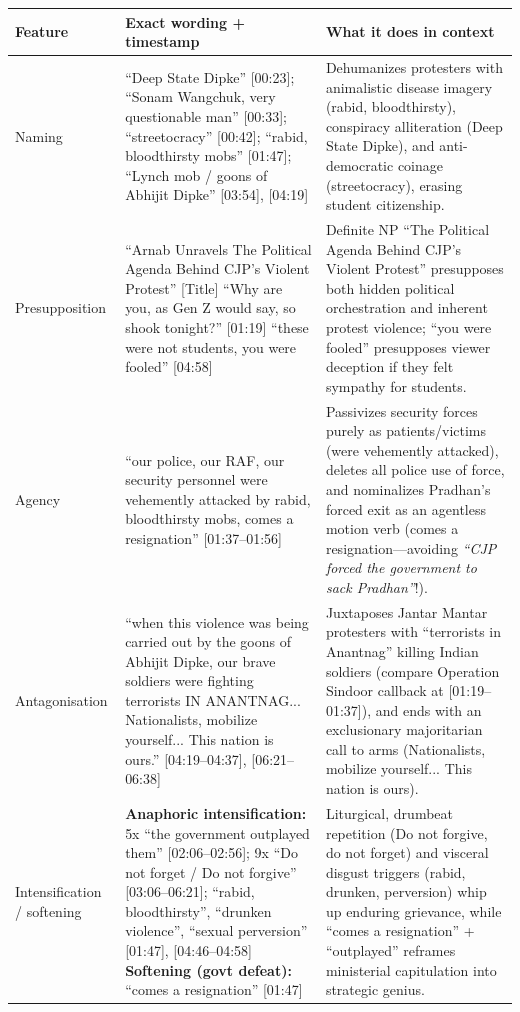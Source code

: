 \documentclass[10pt,a4paper]{article}
\begin{document}
{\small
\begin{longtable}{@{}>{\raggedright\arraybackslash}p{} >{\raggedright\arraybackslash}p{} >{\raggedright\arraybackslash}p{}@{}}
\toprule
\textbf{Feature} & \textbf{Exact wording + timestamp} & \textbf{What it does in context} \\
\midrule
\endhead
Naming & ``Deep State Dipke'' [00:23]; ``Sonam Wangchuk, very questionable man'' [00:33]; ``streetocracy'' [00:42]; ``rabid, bloodthirsty mobs'' [01:47]; ``Lynch mob / goons of Abhijit Dipke'' [03:54], [04:19] & Dehumanizes protesters with animalistic disease imagery (rabid, bloodthirsty), conspiracy alliteration (Deep State Dipke), and anti-democratic coinage (streetocracy), erasing student citizenship. \\
\addlinespace[6pt]
Presupposition & ``Arnab Unravels The Political Agenda Behind CJP's Violent Protest'' [Title] \newline  ``Why are you, as Gen Z would say, so shook tonight?'' [01:19] \newline  ``these were not students, you were fooled'' [04:58] & Definite NP ``The Political Agenda Behind CJP's Violent Protest'' presupposes both hidden political orchestration and inherent protest violence; ``you were fooled'' presupposes viewer deception if they felt sympathy for students. \\
\addlinespace[6pt]
Agency & ``our police, our RAF, our security personnel were vehemently attacked by rabid, bloodthirsty mobs, comes a resignation'' [01:37--01:56] & Passivizes security forces purely as patients/victims (were vehemently attacked), deletes all police use of force, and nominalizes Pradhan's forced exit as an agentless motion verb (comes a resignation---avoiding \emph{``CJP forced the government to sack Pradhan''}!). \\
\addlinespace[6pt]
Antagonisation & ``when this violence was being carried out by the goons of Abhijit Dipke, our brave soldiers were fighting terrorists IN ANANTNAG... Nationalists, mobilize yourself... This nation is ours.'' [04:19--04:37], [06:21--06:38] & Juxtaposes Jantar Mantar protesters with ``terrorists in Anantnag'' killing Indian soldiers (compare Operation Sindoor callback at [01:19--01:37]), and ends with an exclusionary majoritarian call to arms (Nationalists, mobilize yourself... This nation is ours). \\
\addlinespace[6pt]
Intensification / softening & \textbf{Anaphoric intensification:} 5x ``the government outplayed them'' [02:06--02:56]; 9x ``Do not forget / Do not forgive'' [03:06--06:21]; ``rabid, bloodthirsty'', ``drunken violence'', ``sexual perversion'' [01:47], [04:46--04:58] \newline  \textbf{Softening (govt defeat):} ``comes a resignation'' [01:47] & Liturgical, drumbeat repetition (Do not forgive, do not forget) and visceral disgust triggers (rabid, drunken, perversion) whip up enduring grievance, while ``comes a resignation'' + ``outplayed'' reframes ministerial capitulation into strategic genius. \\
\bottomrule
\end{longtable}
}
\end{document}
